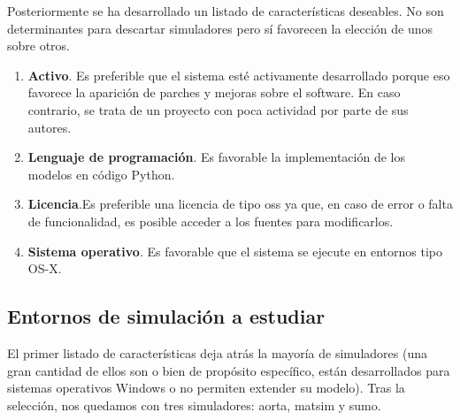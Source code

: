 Posteriormente se ha desarrollado un listado de características deseables. No son determinantes para descartar simuladores pero sí favorecen la elección de unos sobre otros.

\begin{enumerate}
	\item \textbf{Activo}. Es preferible que el sistema esté activamente desarrollado porque eso favorece la aparición de parches y mejoras sobre el software. En caso contrario, se trata de un proyecto con poca actividad por parte de sus autores.
	\item \textbf{Lenguaje de programación}. Es favorable la implementación de los modelos en código Python.
	\item \textbf{Licencia}.Es preferible una licencia de tipo \Ac{oss} ya que, en caso de error o falta de funcionalidad, es posible acceder a los fuentes para modificarlos.
	\item \textbf{Sistema operativo}. Es favorable que el sistema se ejecute en entornos tipo OS-X.
\end{enumerate}

\subsection{Entornos de simulación a estudiar}

El primer listado de características deja atrás la mayoría de simuladores (una gran cantidad de ellos son o bien de propósito específico, están desarrollados para sistemas operativos Windows o no permiten extender su modelo). Tras la selección, nos quedamos con tres simuladores: \ac{aorta}, \ac{matsim} y \ac{sumo}.

